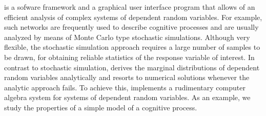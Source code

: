  is a sofware framework and a graphical user interface program that allows of an efficient
analysis of complex systems of dependent random variables. For example, such networks are 
frequently used to describe cognitive processes and are usually analyzed by means of Monte Carlo
type stochastic simulations. Although very flexible, the stochastic simulation approach requires a
large number of samples to be drawn, for obtaining reliable statistics of the response variable of
interest. In contrast to stochastic simulation,  derives the marginal distributions of
dependent random variables analytically and resorts to numerical solutions whenever the analytic
approach fails. To achieve this,   implements a rudimentary computer algebra system
for systems of dependent random variables. As an example, we study the properties of a simple 
model of a cognitive process.

